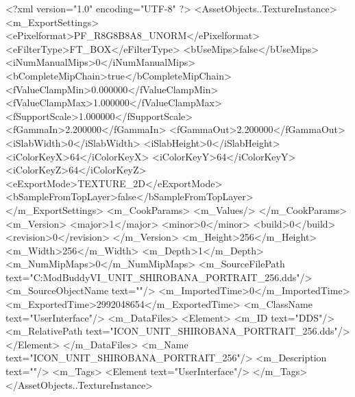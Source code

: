<?xml version="1.0" encoding="UTF-8" ?>
<AssetObjects..TextureInstance>
	<m_ExportSettings>
		<ePixelformat>PF_R8G8B8A8_UNORM</ePixelformat>
		<eFilterType>FT_BOX</eFilterType>
		<bUseMips>false</bUseMips>
		<iNumManualMips>0</iNumManualMips>
		<bCompleteMipChain>true</bCompleteMipChain>
		<fValueClampMin>0.000000</fValueClampMin>
		<fValueClampMax>1.000000</fValueClampMax>
		<fSupportScale>1.000000</fSupportScale>
		<fGammaIn>2.200000</fGammaIn>
		<fGammaOut>2.200000</fGammaOut>
		<iSlabWidth>0</iSlabWidth>
		<iSlabHeight>0</iSlabHeight>
		<iColorKeyX>64</iColorKeyX>
		<iColorKeyY>64</iColorKeyY>
		<iColorKeyZ>64</iColorKeyZ>
		<eExportMode>TEXTURE_2D</eExportMode>
		<bSampleFromTopLayer>false</bSampleFromTopLayer>
	</m_ExportSettings>
	<m_CookParams>
		<m_Values/>
	</m_CookParams>
	<m_Version>
		<major>1</major>
		<minor>0</minor>
		<build>0</build>
		<revision>0</revision>
	</m_Version>
	<m_Height>256</m_Height>
	<m_Width>256</m_Width>
	<m_Depth>1</m_Depth>
	<m_NumMipMaps>0</m_NumMipMaps>
	<m_SourceFilePath text="C:\Users\asus\Documents\Firaxis ModBuddy\Civilization VI\temppic\ICON_UNIT_SHIROBANA_PORTRAIT_256.dds"/>
	<m_SourceObjectName text=""/>
	<m_ImportedTime>0</m_ImportedTime>
	<m_ExportedTime>2992048654</m_ExportedTime>
	<m_ClassName text="UserInterface"/>
	<m_DataFiles>
		<Element>
			<m_ID text="DDS"/>
			<m_RelativePath text="ICON_UNIT_SHIROBANA_PORTRAIT_256.dds"/>
		</Element>
	</m_DataFiles>
	<m_Name text="ICON_UNIT_SHIROBANA_PORTRAIT_256"/>
	<m_Description text=""/>
	<m_Tags>
		<Element text="UserInterface"/>
	</m_Tags>
</AssetObjects..TextureInstance>

